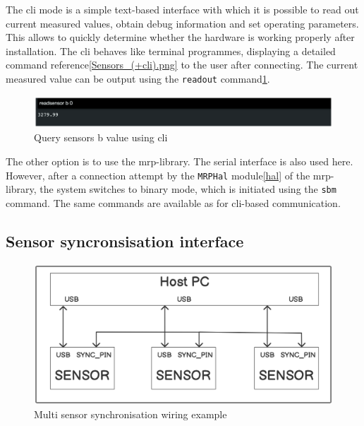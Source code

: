 The \gls{cli} mode is a simple text-based interface with which it is
possible to read out current measured values, obtain debug information
and set operating parameters. This allows to quickly determine whether
the hardware is working properly after installation. The \gls{cli}
behaves like terminal programmes, displaying a detailed command
reference\ref{Sensors_(+cli).png} to the user after connecting. The
current measured value can be output using the
\passthrough{\lstinline!readout!}
command\ref{Query_sensors_b_value_using_(+cli).png}.

\begin{figure}
\centering
\includegraphics{./generated_images/border_Query_sensors_b_value_using_(+cli).png}
\caption{Query sensors b value using \gls{cli}
\label{Query_sensors_b_value_using_(+cli).png}}
\end{figure}

The other option is to use the \gls{mrp}-library. The serial interface
is also used here. However, after a connection attempt by the
\passthrough{\lstinline!MRPHal!} module\ref{hal} of the
\gls{mrp}-library, the system switches to binary mode, which is
initiated using the \passthrough{\lstinline!sbm!} command. The same
commands are available as for \gls{cli}-based communication.

\hypertarget{sensor-syncronsisation-interface}{%
\subsection{Sensor syncronsisation
interface}\label{sensor-syncronsisation-interface}}

\begin{figure}
\centering
\includegraphics{./generated_images/border_Multi_sensor_synchronisation_wiring_example.png}
\caption{Multi sensor synchronisation wiring example
\label{Multi_sensor_synchronisation_wiring_example.png}}
\end{figure}

